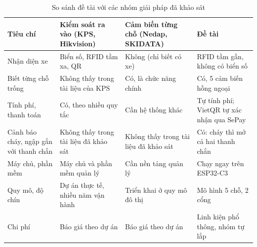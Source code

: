 \begin{table}[H]
\centering\small
\caption{So sánh đề tài với các nhóm giải pháp đã khảo sát}\label{tab:sosanh}
\begin{tabularx}{\linewidth}{@{}>{\raggedright\arraybackslash}p{2.7cm}XXX@{}}
\toprule
\textbf{Tiêu chí} & \textbf{Kiểm soát ra vào (KPS, Hikvision)} & \textbf{Cảm biến từng chỗ (Nedap, SKIDATA)} & \textbf{Đề tài} \\ \midrule
Nhận diện xe & Biển số, RFID tầm xa, QR & Không (chỉ biết có xe) & RFID tầm gần, không có biển số \\
Biết từng chỗ trống & Không thấy trong tài liệu của KPS & Có, là chức năng chính & Có, 5 cảm biến hồng ngoại \\
Tính phí, thanh toán & Có, theo nhiều quy tắc & Cần hệ thống khác & Tự tính phí; VietQR tự xác nhận qua SePay \\
Cảnh báo cháy, ngập gắn với thanh chắn & Không thấy trong tài liệu đã khảo sát & Không thấy trong tài liệu đã khảo sát & Có: cháy thì mở cả hai thanh chắn \\
Máy chủ, phần mềm & Máy chủ và phần mềm quản lý & Cần nền tảng quản lý & Chạy ngay trên ESP32-C3 \\
Quy mô, độ chín & Dự án thực tế, nhiều năm vận hành & Triển khai ở quy mô đô thị & Mô hình 5 chỗ, 2 cổng \\
Chi phí & Báo giá theo dự án & Báo giá theo dự án & Linh kiện phổ thông, nhóm tự lắp \\
\bottomrule
\end{tabularx}
\end{table}

